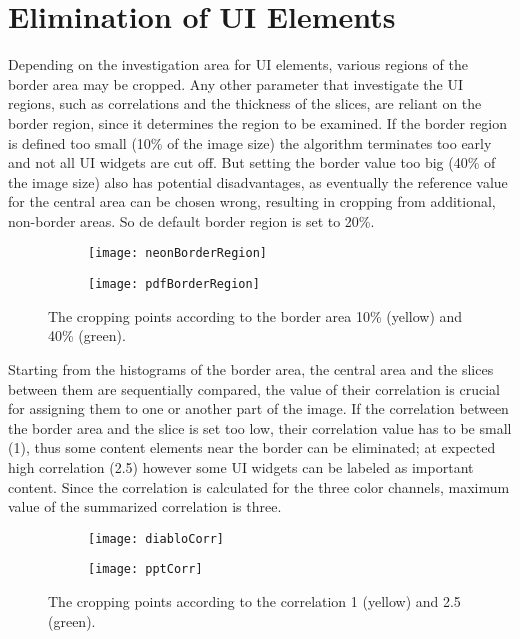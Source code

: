 \documentclass[draft,final]{vutinfth} %
\begin{document}
	\section{Elimination of UI Elements} 
	Depending on the investigation area for UI elements, various regions of the border area may be cropped. 
	Any other parameter that investigate the UI regions, such as correlations and the thickness of the slices, are reliant on the border region, since it determines the region to be examined. 
	If the border region is defined too small (10\% of the image size) the algorithm terminates too early and not all UI widgets are cut off.
	But setting the border value too big (40\% of the image size) also has potential disadvantages, as eventually the reference value for the central area can be chosen wrong, resulting in cropping from additional, non-border areas.
	So de default border region is set to 20\%.\par
	\begin{figure}[H]
		\centering
		\begin{subfigure}[b]{0.45\columnwidth}
			\centering
			\texttt{[image: neonBorderRegion]}
			\label{fig:res:neon}
		\end{subfigure}
		\begin{subfigure}[b]{0.45\columnwidth}
			\centering
			\texttt{[image: pdfBorderRegion]}
			\label{fig:res:pdf}
		\end{subfigure}
		\caption{The cropping points according to the border area 10\% (yellow) and 40\% (green).}
	\end{figure} 
	Starting from the histograms of the border area, the central area and the slices between them are sequentially compared, the value of their correlation is crucial for assigning them to one or another part of the image.
	If the correlation between the border area and the slice is set too low, their correlation value has to be small (1), thus some content elements near the border can be eliminated; at expected high correlation (2.5) however some UI widgets can be labeled as important content.
	Since the correlation is calculated for the three color channels, maximum value of the summarized correlation is three.\par
	\begin{figure}[H]
		\centering
		\begin{subfigure}[b]{0.45\columnwidth}
			\centering
			\texttt{[image: diabloCorr]}
			\label{fig:res:corr1}
		\end{subfigure}
		\begin{subfigure}[b]{0.45\columnwidth}
			\centering
			\texttt{[image: pptCorr]}
			\label{fig:res:corr2}
		\end{subfigure}
		\caption{The cropping points according to the correlation 1 (yellow) and 2.5 (green).}
	\end{figure} 
\end{document}

